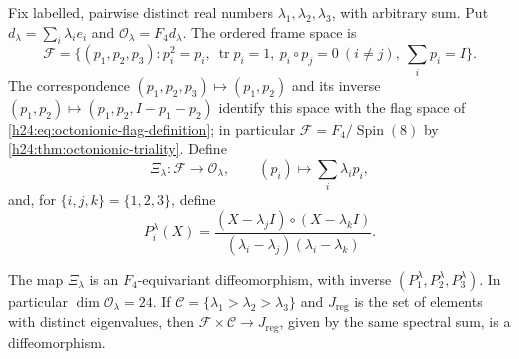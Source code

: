 Fix labelled, pairwise distinct real numbers
$\lambda_1,\lambda_2,\lambda_3$, with arbitrary sum. Put
$d_\lambda=\sum_i\lambda_i e_i$ and
$\mathcal O_\lambda=F_4d_\lambda$. The ordered frame space is
\[
 \mathcal F=\{(p_1,p_2,p_3):p_i^2=p_i,\
 \operatorname{tr}p_i=1,\ p_i\circ p_j=0\ (i\ne j),\
 \textstyle\sum_i p_i=I\}.
\]
The correspondence $(p_1,p_2,p_3)\mapsto(p_1,p_2)$ and its inverse
$(p_1,p_2)\mapsto(p_1,p_2,I-p_1-p_2)$ identify this space with the
flag space of \eqref{h24:eq:octonionic-flag-definition}; in particular
$\mathcal F=F_4/\operatorname{Spin}(8)$ by
\cref{h24:thm:octonionic-triality}. Define
\begin{equation}
 \Xi_\lambda:\mathcal F\longrightarrow\mathcal O_\lambda,
 \qquad (p_i)\longmapsto\sum_i\lambda_i p_i,
 \label{h24:ocb:eq:orbit-map}\tag{OCB7}
\end{equation}
and, for $\{i,j,k\}=\{1,2,3\}$, define
\begin{equation}
 P_i^\lambda(X)=
 \frac{(X-\lambda_jI)\circ(X-\lambda_kI)}
      {(\lambda_i-\lambda_j)(\lambda_i-\lambda_k)}.
 \label{h24:ocb:eq:projectors}\tag{OCB8}
\end{equation}

\begin{proposition}
\label{h24:ocb:prop:spectral-diffeomorphism}
The map $\Xi_\lambda$ is an $F_4$-equivariant diffeomorphism, with
inverse $(P_1^\lambda,P_2^\lambda,P_3^\lambda)$. In particular
$\dim\mathcal O_\lambda=24$. If
$\mathcal C=\{\lambda_1>\lambda_2>\lambda_3\}$ and
$J_{\mathrm{reg}}$ is the set of elements with distinct eigenvalues,
then $\mathcal F\times\mathcal C\to J_{\mathrm{reg}}$, given by the
same spectral sum, is a diffeomorphism.
\end{proposition}

